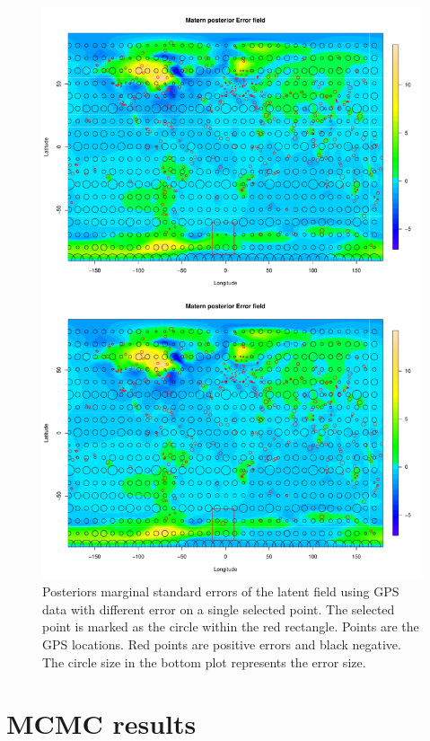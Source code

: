 \documentclass[a4paper,12pt]{article}
\begin{document}
 \begin{figure}[htbp]
 \begin{center}
 \includegraphics[scale=0.5]{fig/PointErr_GIAfield.pdf}
 \end{center}
 \caption[Posterior marginal standard errors of the latent field]{Posteriors marginal standard errors of the latent field using GPS data with different error on a single selected point. The selected point is marked as the circle within the red rectangle. Points are the GPS locations. Red points are positive errors and black negative. The circle size in the bottom plot represents the error size.}
 \label{fig:6}
 \end{figure}
 
 

\section{MCMC results}
\end{document}

